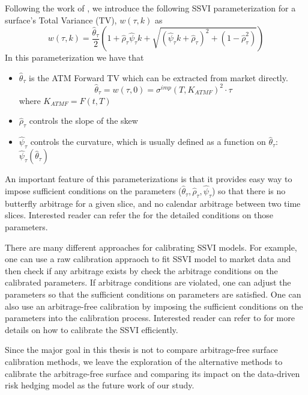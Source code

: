 \documentclass[letterpaper,12pt,titlepage,oneside,final]{book}
\numberwithin{equation}{section}
\theoremstyle{definition}
\begin{document}
 Following the work of \cite{corbetta2019robust}, we introduce the following SSVI parameterization for a surface's Total Variance (TV), $w(\tau,k)$ as
 \begin{equation}
 w(\tau,k) = \frac{\hat{\theta}_{\tau}}{2}\left( 1 + \hat{\rho}_{\tau} \hat{\psi}_{\tau} k + \sqrt{ \left(\hat{\psi}_{\tau} k + \hat{\rho}_{\tau} \right)^2 + \left(1 - \hat{\rho}_{\tau}^2 \right) } \right)
 \label{eqn:w}
 \end{equation}
 In this parameterization we have that 
 \begin{itemize}
 \item $\hat{\theta}_{\tau}$ is the ATM Forward TV which can be extracted from market directly.
 \[
 \hat{\theta}_{\tau} = w(\tau,0) = \sigma^{imp}(T,K_{ATMF})^2 \cdot \tau
 \]
 where $K_{ATMF}=F(t,T)$
  \item $\hat{\rho}_{\tau}$ controls the slope of the skew 
 \item $\hat{\psi}_{\tau}$ controls the curvature, which is usually defined as a function on  $\hat{\theta}_{\tau}$: $\hat{\psi}_{\tau}(\hat{\theta}_{\tau})$
 \end{itemize}
 
 An important feature of this parameterizations is that it provides easy way to impose sufficient conditions on the  parameters ($\hat{\theta}_{\tau},\hat{\rho}_{\tau},\hat{\psi}_{\tau}$) so that there is no butterfly arbitrage for a given slice, and no calendar arbitrage between two time slices. Interested reader can refer the \cite{corbetta2019robust,gatheral2014arbitrage} for the detailed conditions on those parameters. 
 
 There are many different approaches for calibrating SSVI models. For example, one can use a raw calibration appraoch to fit SSVI model to market data and then check if any arbitrage exists by check the arbitrage conditions on  the calibrated parameters. If arbitrage conditions are violated, one can adjust the parameters so that the sufficient conditions on parameters are satisfied.
 One can also  use an arbitrage-free calibration \cite{corbetta2019robust} by imposing the  sufficient conditions on the parameters into the calibration process. Interested reader can refer to \cite{hendriks2017extended,corbetta2019robust} for more details on how to calibrate the SSVI efficiently.
  
Since the major goal in this thesis is not to compare  arbitrage-free surface calibration methods, we leave the exploration of the alternative methods to calibrate the arbitrage-free surface and comparing its impact on the data-driven risk hedging model as the future work of our study. 
\end{document}

